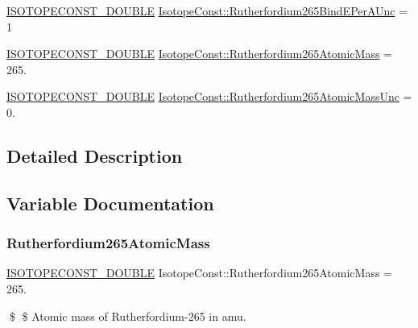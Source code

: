 \begin{DoxyCompactItemize}
\item 
\mbox{\hyperlink{group___isotope_const-_macros_ga8f45a7272ce02c0b4c65c44636ed719a}{I\+S\+O\+T\+O\+P\+E\+C\+O\+N\+S\+T\+\_\+\+D\+O\+U\+B\+LE}} \mbox{\hyperlink{group___isotope_const-_rutherfordium-_rf265_gae9e519edd0d5bed7f7d0bfa1f4847b3b}{Isotope\+Const\+::\+Rutherfordium265\+Bind\+E\+Per\+A\+Unc}} = 1
\item 
\mbox{\hyperlink{group___isotope_const-_macros_ga8f45a7272ce02c0b4c65c44636ed719a}{I\+S\+O\+T\+O\+P\+E\+C\+O\+N\+S\+T\+\_\+\+D\+O\+U\+B\+LE}} \mbox{\hyperlink{group___isotope_const-_rutherfordium-_rf265_ga2633823825b6a609e879734d1493b9d1}{Isotope\+Const\+::\+Rutherfordium265\+Atomic\+Mass}} = 265.
\item 
\mbox{\hyperlink{group___isotope_const-_macros_ga8f45a7272ce02c0b4c65c44636ed719a}{I\+S\+O\+T\+O\+P\+E\+C\+O\+N\+S\+T\+\_\+\+D\+O\+U\+B\+LE}} \mbox{\hyperlink{group___isotope_const-_rutherfordium-_rf265_ga8e2309ceb71ded0bbe0c040ce5decdb7}{Isotope\+Const\+::\+Rutherfordium265\+Atomic\+Mass\+Unc}} = 0.
\end{DoxyCompactItemize}


\subsection{Detailed Description}


\subsection{Variable Documentation}
\mbox{\label{group___isotope_const-_rutherfordium-_rf265_ga2633823825b6a609e879734d1493b9d1}} 
\subsubsection{\texorpdfstring{Rutherfordium265\+Atomic\+Mass}{Rutherfordium265AtomicMass}}
{\footnotesize\ttfamily \mbox{\hyperlink{group___isotope_const-_macros_ga8f45a7272ce02c0b4c65c44636ed719a}{I\+S\+O\+T\+O\+P\+E\+C\+O\+N\+S\+T\+\_\+\+D\+O\+U\+B\+LE}} Isotope\+Const\+::\+Rutherfordium265\+Atomic\+Mass = 265.}

\$ \$ Atomic mass of Rutherfordium-\/265 in amu. \mbox{\label{group___isotope_const-_rutherfordium-_rf265_ga8e2309ceb71ded0bbe0c040ce5decdb7}} 
